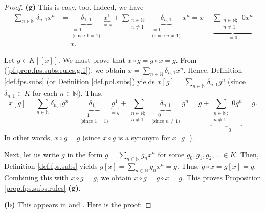 \begin{proof}
\textbf{(g)} This is easy, too. Indeed, we have%
\begin{align}
\sum_{n\in\mathbb{N}}\delta_{n,1}x^{n}  &  =\underbrace{\delta_{1,1}%
}_{\substack{=1\\\text{(since }1=1\text{)}}}\underbrace{x^{1}}_{=x}%
+\sum_{\substack{n\in\mathbb{N};\\n\neq1}}\underbrace{\delta_{n,1}%
}_{\substack{=0\\\text{(since }n\neq1\text{)}}}x^{n}=x+\underbrace{\sum
_{\substack{n\in\mathbb{N};\\n\neq1}}0x^{n}}_{=0}\nonumber\\
&  =x. \label{pf.prop.fps.subs.rules.g.1}%
\end{align}


Let $g\in K\left[  \left[  x\right]  \right]  $. We must prove that $x\circ
g=g\circ x=g$. From (\ref{pf.prop.fps.subs.rules.g.1}), we obtain
$x=\sum_{n\in\mathbb{N}}\delta_{n,1}x^{n}$. Hence, Definition
\ref{def.fps.subs} (or Definition \ref{def.pol.subs}) yields $x\left[
g\right]  =\sum_{n\in\mathbb{N}}\delta_{n,1}g^{n}$ (since $\delta_{n,1}\in K$
for each $n\in\mathbb{N}$). Thus,%
\[
x\left[  g\right]  =\sum_{n\in\mathbb{N}}\delta_{n,1}g^{n}=\underbrace{\delta
_{1,1}}_{\substack{=1\\\text{(since }1=1\text{)}}}\underbrace{g^{1}}_{=g}%
+\sum_{\substack{n\in\mathbb{N};\\n\neq1}}\underbrace{\delta_{n,1}%
}_{\substack{=0\\\text{(since }n\neq1\text{)}}}g^{n}=g+\underbrace{\sum
_{\substack{n\in\mathbb{N};\\n\neq1}}0g^{n}}_{=0}=g.
\]
In other words, $x\circ g=g$ (since $x\circ g$ is a synonym for $x\left[
g\right]  $).

Next, let us write $g$ in the form $g=\sum_{n\in\mathbb{N}}g_{n}x^{n}$ for
some $g_{0},g_{1},g_{2},\ldots\in K$. Then, Definition \ref{def.fps.subs}
yields $g\left[  x\right]  =\sum_{n\in\mathbb{N}}g_{n}x^{n}=g$. Thus, $g\circ
x=g\left[  x\right]  =g$. Combining this with $x\circ g=g$, we obtain $x\circ
g=g\circ x=g$. This proves Proposition \ref{prop.fps.subs.rules} \textbf{(g)}.

\bigskip

\textbf{(b)} This appears in \cite[Theorem 7.62]{Loehr-BC} and
\cite[Proposition 2.2.2]{Brewer14}. Here is the proof:


\end{proof}
